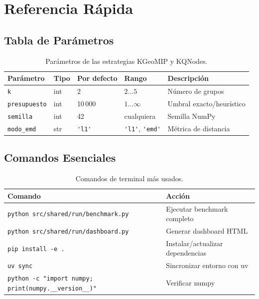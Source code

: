\section{Referencia Rápida}
\label{sec:referencia}

\subsection{Tabla de Parámetros}

\begin{table}[H]
    \centering
    \caption{Parámetros de las estrategias KGeoMIP y KQNodes.}
    \label{tab:params}
    \begin{tabular}{lllll}
        \toprule
        \textbf{Parámetro} & \textbf{Tipo} & \textbf{Por defecto} & \textbf{Rango} & \textbf{Descripción} \\
        \midrule
        \lstinline|k|           & int   & 2       & $2\ldots5$   & Número de grupos \\
        \lstinline|presupuesto| & int   & 10\,000 & $1\ldots\infty$ & Umbral exacto/heurístico \\
        \lstinline|semilla|     & int   & 42      & cualquiera   & Semilla NumPy \\
        \lstinline|modo_emd|    & str   & \lstinline|'l1'|     & \lstinline|'l1'|, \lstinline|'emd'| & Métrica de distancia \\
        \bottomrule
    \end{tabular}
\end{table}

\subsection{Comandos Esenciales}

\begin{table}[H]
    \centering
    \caption{Comandos de terminal más usados.}
    \begin{tabular}{ll}
        \toprule
        \textbf{Comando} & \textbf{Acción} \\
        \midrule
        \lstinline|python src/shared/run/benchmark.py|  & Ejecutar benchmark completo \\
        \lstinline|python src/shared/run/dashboard.py|  & Generar dashboard HTML \\
        \lstinline|pip install -e .|                    & Instalar/actualizar dependencias \\
        \lstinline|uv sync|                             & Sincronizar entorno con uv \\
        \lstinline|python -c "import numpy; print(numpy.__version__)"| & Verificar numpy \\
        \bottomrule
    \end{tabular}
\end{table}

